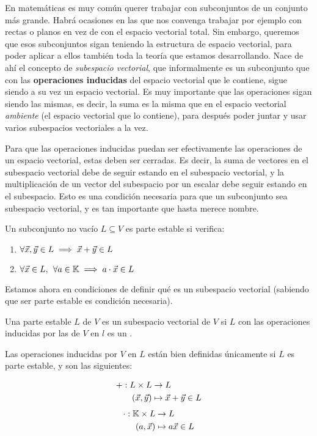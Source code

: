 \documentclass[../algebra_lineal.tex]{subfiles}
\begin{document}
En matemáticas es muy común querer trabajar con subconjuntos de un conjunto más grande. Habrá ocasiones en las que nos convenga trabajar por ejemplo con rectas o planos en vez de con el espacio vectorial total. Sin embargo, queremos que esos subconjuntos sigan teniendo la estructura de espacio vectorial, para poder aplicar a ellos también toda la teoría que estamos desarrollando. Nace de ahí el concepto de \textit{subespacio vectorial}, que informalmente es un subconjunto que con las \textbf{operaciones inducidas} del espacio vectorial que le contiene, sigue siendo a su vez un espacio vectorial. Es muy importante que las operaciones sigan siendo las mismas, es decir, la suma es la misma que en el espacio vectorial \textit{ambiente} (el espacio vectorial que lo contiene), para después poder juntar y usar varios subespacios vectoriales a la vez.

Para que las operaciones inducidas puedan ser efectivamente las operaciones de un espacio vectorial, estas deben ser cerradas. Es decir, la suma de vectores en el subespacio vectorial debe de seguir estando en el subespacio vectorial, y la multiplicación de un vector del subespacio por un escalar debe seguir estando en el subespacio. Esto es una condición necesaria para que un subconjunto sea subespacio vectorial, y es tan importante que hasta merece nombre.

\begin{definition}
    Un subconjunto no vacío $L\subseteq V$ es parte estable si verifica:
    \begin{enumerate}
        \item $\forall \vec{x}, \vec{y} \in L \implies \vec{x} + \vec{y} \in L$
        \item $\forall \vec{x} \in L, \hspace{1.5mm} \forall a \in \mathbb{K} \implies a\cdot \vec{x} \in L$
    \end{enumerate}
\end{definition}

Estamos ahora en condiciones de definir qué es un subespacio vectorial (sabiendo que ser parte estable es condición necesaria).

\begin{definition}
    Una parte estable $L$ de $V$ es un subespacio vectorial de $V$ si $L$ con las operaciones inducidas por las de $V$ en $l$ es un \kvspace.
\end{definition}

\begin{remark}
    Las operaciones inducidas por $V$ en $L$ están bien definidas únicamente si $L$ es parte estable, y son las siguientes:
    \begin{multicols}{2}
        \noindent
        \begin{align*} +: L \times L &\to L \\
                (\vec{x}, \vec{y}) &\mapsto \vec{x} + \vec{y} \in L
        \end{align*}
        \noindent
        \begin{align*}
            \cdot: \mathbb{K} \times L &\to L \\
                (a, \vec{x}) &\mapsto a \vec{x} \in L
        \end{align*}
    \end{multicols} 
\end{remark}
\end{document}
